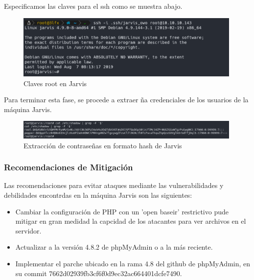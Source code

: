         \large{Especificamos las claves para el ssh como se muestra abajo.}
        \par
        \begin{figure}[H]
            \centering
            \includegraphics[width=0.99\textwidth]{imagenes/jarvis/28_ssh_root_jarvis.png}
            \caption{Claves root en Jarvis}
        \end{figure}

        \large{Para terminar esta fase, se procede a extraer ña credenciales de los usuarios de la máquina Jarvis.}
        \par
        \begin{figure}[H]
            \centering
            \includegraphics[width=0.99\textwidth]{imagenes/jarvis/29_hashes_jarvis.png}
            \caption{Extracción de contraseñas en formato hash de Jarvis}
        \end{figure}

    \subsubsection{Recomendaciones de Mitigación}

        \large{Las recomendaciones para evitar ataques mediante las vulnerabilidades y debilidades encontrdas en la máquina Jarvis son las siguientes:}
        \begin{itemize}
            \item Cambiar la configuración de PHP con un 'open baseir' restrictivo pude mitigar en gran medidad la capcidad de los atacantes para  ver archivos en el servidor. 
            \item Actualizar a la versión 4.8.2 de phpMyAdmin o a la más reciente.
            \item Implementar el parche ubicado en la rama 4.8 del github de phpMyAdmin, en su commit 7662d02939fb3cf6f0d9ec32ac664401dcfe7490. 
        \end{itemize}
